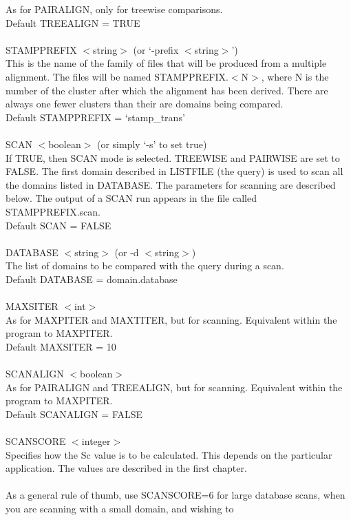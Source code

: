 As for PAIRALIGN, only for treewise comparisons.\\
Default TREEALIGN = TRUE\\
\\
STAMPPREFIX $<$string$>$ (or `-prefix $<$string$>$')\\
This is the name of the family of files that will be produced from 
a multiple alignment.  The files will be named STAMPPREFIX.$<$N$>$, 
where N is the number of the cluster after which the alignment 
has been derived.  There are always one fewer clusters than their 
are domains being compared.\\
Default STAMPPREFIX = `stamp\_trans'\\
\\
SCAN $<$boolean$>$ (or simply `-s' to set true) \\
If TRUE, then SCAN mode is selected.  TREEWISE and PAIRWISE are set
to FALSE.  The first domain described in LISTFILE (the query) is 
used to scan all the domains listed in DATABASE.  The parameters 
for scanning are described below.  The output of a SCAN run appears
in the file called STAMPPREFIX.scan.\\
Default SCAN = FALSE\\
\\
DATABASE $<$string$>$ (or -d $<$string$>$)\\
The list of domains to be compared with the query during a scan.\\
Default DATABASE = domain.database\\
\\
MAXSITER $<$int$>$\\
As for MAXPITER and MAXTITER, but for scanning.  Equivalent
within the program to MAXPITER.\\
Default MAXSITER = 10\\
\\
SCANALIGN $<$boolean$>$\\
As for PAIRALIGN and TREEALIGN, but for scanning.  Equivalent
within the program to MAXPITER.\\
Default SCANALIGN = FALSE\\
\\
SCANSCORE $<$integer$>$\\
Specifies how the Sc value is to be calculated.  This depends on
the particular application.  The values are described in the
first chapter.\\
\\
As a general rule of thumb, use SCANSCORE=6 for large database
scans, when you are scanning with a small domain, and wishing to

